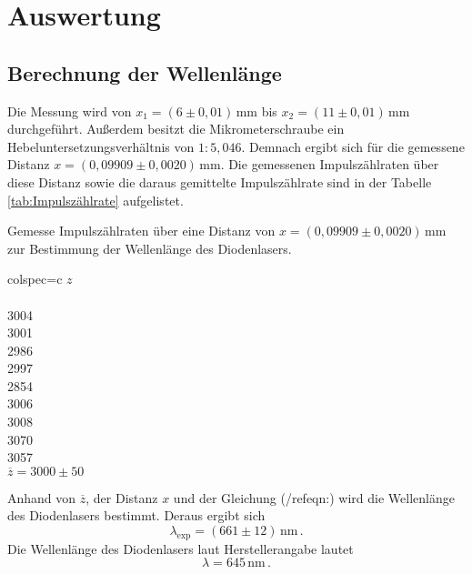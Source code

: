 \section{Auswertung}
\label{sec:Auswertung}
\subsection{Berechnung der Wellenlänge}
Die Messung wird von $x_1 = (6 \pm 0,01)\,\unit{\milli\metre}$ bis $x_2 = (11 \pm 0,01)\,\unit{\milli\metre}$ durchgeführt. Außerdem besitzt die Mikrometerschraube ein Hebeluntersetzungsverhältnis von 
$1 : 5,046$.  Demnach ergibt sich für die gemessene Distanz $x = (0,09909\pm 0,0020) \,\unit{\milli\metre}$. Die gemessenen Impulszählraten über diese Distanz sowie die daraus gemittelte Impulszählrate
sind in der Tabelle \ref{tab:Impulszählrate} aufgelistet.
\begin{table}[H]
    \centering
    \caption{Gemesse Impulszählraten über eine Distanz von $x = (0,09909\pm 0,0020) \,\unit{\milli\metre}$ zur Bestimmung der Wellenlänge des Diodenlasers.}
    \label{tab:Impulszählrate}
    \begin{tblr}{colspec={c}}
        \toprule
        $z$\\
        \\
        3004\\
        3001\\
        2986\\
        2997\\
        2854\\
        3006\\
        3008\\
        3070\\
        3057\\
        \midrule
        $\overline{z} = 3000\pm50$\\
        \bottomrule
    \end{tblr}
\end{table}
Anhand von $\overline{z}$, der Distanz $x$ und der Gleichung (/ref{eqn:}) wird die Wellenlänge des Diodenlasers bestimmt. Deraus ergibt sich
$$\lambda _{\text{exp}} = (661 \pm 12)\,\unit{\nano\metre}\,.$$
Die Wellenlänge des Diodenlasers laut Herstellerangabe lautet
$$\lambda = 645\,\unit{\nano\metre}\,.$$

